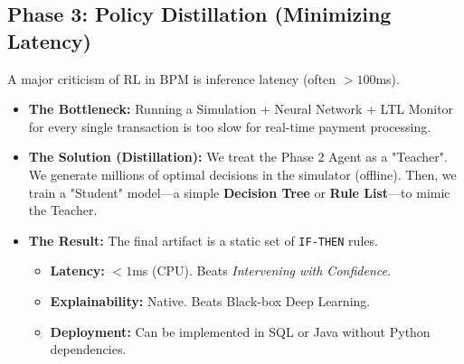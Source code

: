 \documentclass[a4paper]{article}
\begin{document}
\subsection{Phase 3: Policy Distillation (Minimizing Latency)}
A major criticism of RL in BPM is inference latency (often $>100$ms).
\begin{itemize}
    \item \textbf{The Bottleneck:} Running a Simulation + Neural Network + LTL Monitor for every single transaction is too slow for real-time payment processing.
    \item \textbf{The Solution (Distillation):} We treat the Phase 2 Agent as a "Teacher". We generate millions of optimal decisions in the simulator (offline). Then, we train a "Student" model—a simple \textbf{Decision Tree} or \textbf{Rule List}—to mimic the Teacher.
    \item \textbf{The Result:} The final artifact is a static set of \texttt{IF-THEN} rules.
    \begin{itemize}
        \item \textbf{Latency:} $<1$ms (CPU). Beats \textit{Intervening with Confidence}.
        \item \textbf{Explainability:} Native. Beats Black-box Deep Learning.
        \item \textbf{Deployment:} Can be implemented in SQL or Java without Python dependencies.
    \end{itemize}
\end{itemize}
\end{document}
